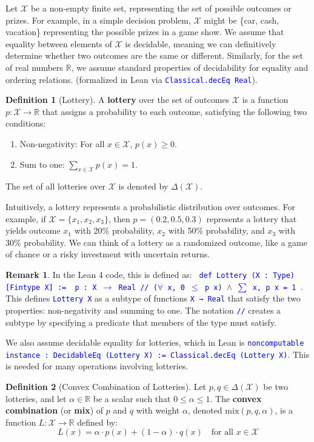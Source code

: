 \documentclass{article}
\theoremstyle{definition}
\newtheorem{definition}{Definition}[section]
\newtheorem{remark}{Remark}[section]
\newcommand{\R}{\mathbb{R}}
\newcommand{\X}{\mathcal{X}}
\newcommand{\tactic}[1]{\textcolor{blue}{\texttt{#1}}}
\newcommand{\DeltaX}{\Delta(\X)} %
\newcommand{\mix}{\mathrm{mix}} %
\begin{document}
Let $\X$ be a non-empty finite set, representing the set of possible outcomes or prizes. For example, in a simple decision problem,
$\X$ might be \{car, cash, vacation\} representing the possible prizes in a game show.  We assume that equality between elements of
$\X$ is decidable, meaning we can definitively determine whether two outcomes are the same or different. Similarly, for the set of real numbers
$\R$, we assume standard properties of decidability for equality and ordering relations. (formalized in Lean via \tactic{Classical.decEq Real}).

\begin{definition}[Lottery]\label{def:lottery}
A \textbf{lottery} over the set of outcomes $\X$ is a function $p: \X \to \R$ that assigns a probability to each outcome, satisfying the following two conditions:
\begin{enumerate}
    \item Non-negativity: For all $x \in \X$, $p(x) \ge 0$.
    \item Sum to one: $\sum_{x \in \X} p(x) = 1$.
\end{enumerate}
The set of all lotteries over $\X$ is denoted by $\DeltaX$.
\end{definition}

Intuitively, a lottery represents a probabilistic distribution over outcomes. For example, if $\X=\{x_1,x_2,x_3\}$, then $p=(0.2,0.5,0.3)$ represents a lottery that yields outcome $x_1$ with 20\% probability, $x_2$ with 50\% probability, and $x_3$ with 30\% probability. We can think of a lottery as a randomized outcome, like a game of chance or a risky investment with uncertain returns.

\begin{remark}
In the Lean 4 code, this is defined as: \tactic{
def Lottery (X : Type) [Fintype X] :=
  { p : X $\rightarrow$ Real // ($\forall$ x, 0 $\le$ p x) $\wedge$ $\sum$ x, p x = 1 }}.
This defines \tactic{Lottery X} as a subtype of functions \tactic{X → Real} that satisfy the two properties: non-negativity and summing to one. The notation \tactic{//} creates a subtype by specifying a predicate that members of the type must satisfy.

We also assume decidable equality for lotteries, which in Lean is \tactic{noncomputable instance : DecidableEq (Lottery X) := Classical.decEq (Lottery X)}. This is needed for many operations involving lotteries.
\end{remark}

\begin{definition}[Convex Combination of Lotteries]\label{def:mix}
Let $p, q \in \DeltaX$ be two lotteries, and let $\alpha \in \R$ be a scalar such that $0 \le \alpha \le 1$. The \textbf{convex combination} (or \textbf{mix}) of $p$ and $q$ with weight $\alpha$, denoted $\mix(p, q, \alpha)$, is a function $L: \X \to \R$ defined by:
\[ L(x) = \alpha \cdot p(x) + (1-\alpha) \cdot q(x) \quad \text{for all } x \in \X \]
\end{definition}
\end{document}
